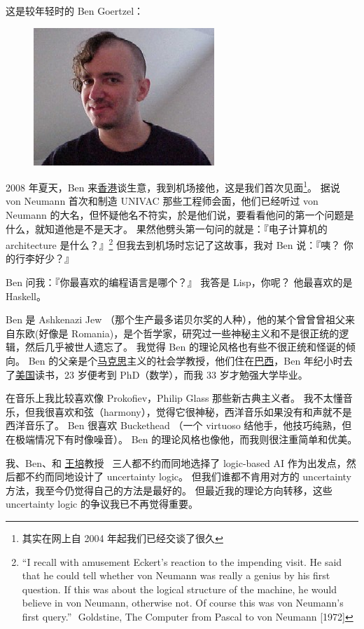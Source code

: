 \documentclass[12pt]{report}
\newcommand*\dashh{\textemdash\,\,}
\begin{document}
{这是较年轻时的 Ben Goertzel：
\begin{figure}[H]
\centering
\includegraphics[scale=2.5]{benbenben.jpg}
\end{figure}

2008 年夏天，Ben 来\uline{香港}谈生意，我到机场接他，这是我们首次见面\footnote{其实在网上自 2004 年起我们已经交谈了很久}。 据说 von Neumann 首次和制造 UNIVAC 那些工程师会面，他们已经听过 von Neumann 的大名，但怀疑他名不符实，於是他们说，要看看他问的第一个问题是什么，就知道他是不是天才。  果然他劈头第一句问的就是：『电子计算机的 architecture 是什么？』\footnote{``I recall with amusement Eckert's reaction to the impending visit. He said that he could tell whether von Neumann was really a genius by his first question. If this was about the logical structure of the machine, he would believe in von Neumann, otherwise not. Of course this was von Neumann's first query.'' \dashh Goldstine, The Computer from Pascal to von Neumann [1972]}  但我去到机场时忘记了这故事，我对 Ben 说：『咦？ 你的行李好少？』

Ben 问我：『你最喜欢的编程语言是哪个？』 我答是 Lisp，你呢？ 他最喜欢的是 Haskell。

Ben 是 Ashkenazi Jew （那个生产最多诺贝尔奖的人种），他的某个曾曾曾祖父来自东欧(好像是 Romania)，是个哲学家，研究过一些神秘主义和不是很正统的逻辑，然后几乎被世人遗忘了。 我觉得 Ben 的理论风格也有些不很正统和怪诞的倾向。  Ben 的父亲是个\uline{马克思}主义的社会学教授，他们住在\uline{巴西}，Ben 年纪小时去了\uline{美国}读书，23 岁便考到 PhD（数学），而我 33 岁才勉强大学毕业。

在音乐上我比较喜欢像 Prokofiev，Philip Glass 那些新古典主义者。 我不太懂音乐，但我很喜欢和弦（harmony），觉得它很神秘，西洋音乐如果没有和声就不是西洋音乐了。 Ben 很喜欢 Buckethead （一个 virtuoso 结他手，他技巧纯熟，但在极端情况下有时像噪音）。 Ben 的理论风格也像他，而我则很注重简单和优美。

我、Ben、和 \uline{王培}教授 ~三人都不约而同地选择了 logic-based AI 作为出发点，然后都不约而同地设计了 uncertainty logic。  但我们谁都不肯用对方的 uncertainty 方法，我至今仍觉得自己的方法是最好的。 但最近我的理论方向转移，这些 uncertainty logic 的争议我已不再觉得重要。

}
\end{document}
